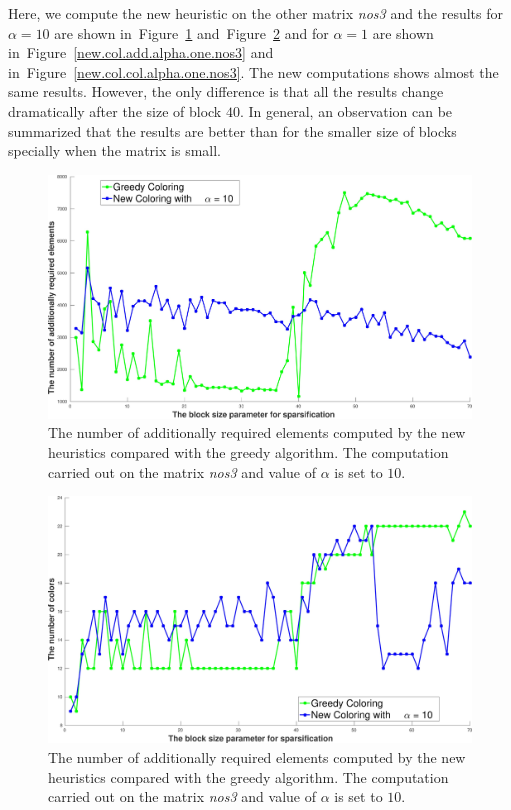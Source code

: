 \documentclass[12pt, oneside]{book}
\newcommand{\figref}[1]{Figure~\protect\ref{#1}}
\begin{document}
Here, we compute the new heuristic on the other matrix \textit{nos3}
and the results for $\alpha=10$ are shown in~\figref{new.col.add.alpha.ten.nos3}
and~\figref{new.col.col.alpha.ten.nos3}
and for $\alpha=1$ are shown in~\figref{new.col.add.alpha.one.nos3} and
in~\figref{new.col.col.alpha.one.nos3}.
The new computations shows almost the same results. However,
the only difference is that all the results change dramatically
after the size of block $40$. In general, an observation can be 
summarized that the results are better than for the smaller size of blocks
specially when the matrix is small.

\begin{figure}
\centering
\includegraphics[width=0.9\linewidth]{bls_add_alpha_10_nos3}
\caption{The number of additionally required elements computed by the new heuristics compared with the 
greedy algorithm. The computation carried out on the matrix \textit{nos3} and value of $\alpha$ is 
set to $10$.}
\label{new.col.add.alpha.ten.nos3}
\end{figure}
\begin{figure}
\centering
\includegraphics[width=0.9\linewidth]{bls_col_alpha_10_nos3}
\caption{The number of additionally required elements computed by the new heuristics compared with the 
greedy algorithm. The computation carried out on the matrix \textit{nos3} and value of $\alpha$ is 
set to $10$.}
\label{new.col.col.alpha.ten.nos3}
\end{figure}
\end{document}
